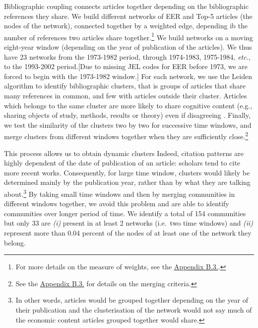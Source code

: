 \documentclass[]{elsarticle} %
\begin{document}
Bibliographic coupling connects articles together depending on the
bibliographic references they share. We build different networks of EER
and Top-5 articles (the nodes of the network), connected together by a
weighted edge, depending ib the number of references two articles share
together.\footnote{For more details on the measure of weights, see the
  \protect\hyperlink{network}{Appendix B.3.}.} We build networks on a
moving eight-year window (depending on the year of publication of the
articles). We thus have 23 networks from the 1973-1982 period, through
1974-1983, 1975-1984, \emph{etc.}, to the 1993-2002 period.{[}Due to
missing JEL codes for EER before 1973, we are forced to begin with the
1973-1982 window.{]} For each network, we use the Leiden algorithm
\citep{traag2019} to identify bibliographic clusters, that is groups of
articles that share many references in common, and few with articles
outside their cluster. Articles which belongs to the same cluster are
more likely to share cognitive content (e.g., sharing objects of study,
methods, results or theory) even if disagreeing
\citep{claveau2016, truc2021, goutsmedt2021}. Finally, we test the
similarity of the clusters two by two for successive time windows, and
merge clusters from different windows together when they are
sufficiently close.\footnote{See the
  \protect\hyperlink{network}{Appendix B.3.} for details on the merging
  criteria.}

This process allows us to obtain dynamic clusters Indeed, citation
patterns are highly dependent of the date of publication of an article:
scholars tend to cite more recent works. Consequently, for large time
window, clusters would likely be determined mainly by the publication
year, rather than by what they are talking about.\footnote{In other
  words, articles would be grouped together depending on the year of
  their publication and the clusterisation of the network would not say
  much of the economic content articles grouped together would share.}
By taking small time windows and then by merging communities in
different windows together, we avoid this problem and are able to
identify communities over longer period of time. We identify a total of
154 communities but only 33 are \emph{(i)} present in at least 2
networks (i.e.~two time windows) and \emph{(ii)} represent more than
0.04 percent of the nodes of at least one of the network they belong.
\end{document}
